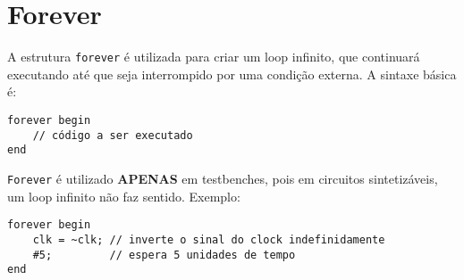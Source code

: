\documentclass{article}
\begin{document}
\section*{Forever}

A estrutura \texttt{forever} é utilizada para criar um loop infinito, que continuará executando até que seja interrompido por uma condição externa. A sintaxe básica é:

\begin{lstlisting}
forever begin
    // código a ser executado
end
\end{lstlisting}

\texttt{Forever} é utilizado \textbf{APENAS} em testbenches, pois em circuitos sintetizáveis, um loop infinito não faz sentido. Exemplo:

\begin{lstlisting}
forever begin
    clk = ~clk; // inverte o sinal do clock indefinidamente
    #5;         // espera 5 unidades de tempo
end
\end{lstlisting}
\end{document}

